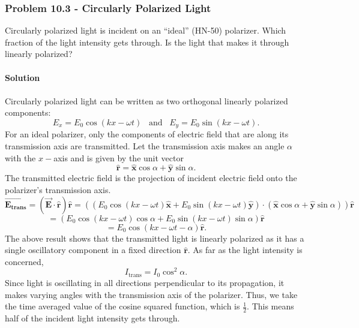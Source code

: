 \documentclass{article}
\begin{document}
\subsubsection*{Problem 10.3 - Circularly Polarized Light}
Circularly polarized light is incident on an “ideal” (HN-50) polarizer. Which fraction of the light intensity gets through. Is the light that makes it through linearly polarized?
\\
\\\textbf{Solution}
\\
\\Circularly polarized light can be written as two orthogonal linearly polarized components:
\[E_x=E_0\cos(kx-\omega t)\,\,\,\,\,\text{and}\,\,\,\,\,E_y=E_0\sin(kx-\omega t).\]
For an ideal polarizer, only the components of electric field that are along its transmission axis are transmitted. Let the transmission axis makes an angle $\alpha$ with the $x-$axis and is given by the unit vector
\[\boldsymbol{\hat{r}}=\boldsymbol{\hat{x}}\cos\alpha+\boldsymbol{\hat{y}}\sin\alpha.\]
The transmitted electric field is the projection of incident electric field onto the polarizer's transmission axis. 
\[\boldsymbol{\vec{E_{\text{trans}}}}=(\boldsymbol{\vec{E}}\cdot\boldsymbol{\hat{r}})\boldsymbol{\hat{r}}=((E_0\cos(kx-\omega t)\boldsymbol{\hat{x}}+E_0\sin(kx-\omega t)\boldsymbol{\hat{y}})\cdot(\boldsymbol{\hat{x}}\cos\alpha+\boldsymbol{\hat{y}}\sin\alpha))\boldsymbol{\hat{r}}\]
\[=(E_0\cos(kx-\omega t)\cos\alpha+E_0\sin(kx-\omega t)\sin\alpha)\boldsymbol{\hat{r}}\]
\[=E_0\cos(kx-\omega t-\alpha)\boldsymbol{\hat{r}}.\]
The above result shows that the transmitted light is linearly polarized as it has a single oscillatory component in a fixed direction $\boldsymbol{\hat{r}}$.
As far as the light intensity is concerned, 
\[I_{\text{trans}}=I_0\cos^2\alpha.\]
Since light is oscillating in all directions perpendicular to its propagation, it makes varying angles with the transmission axis of the polarizer. Thus, we take the time averaged value of the cosine squared function, which is $\frac{1}{2}$. This means half of the incident light intensity gets through.
\end{document}
